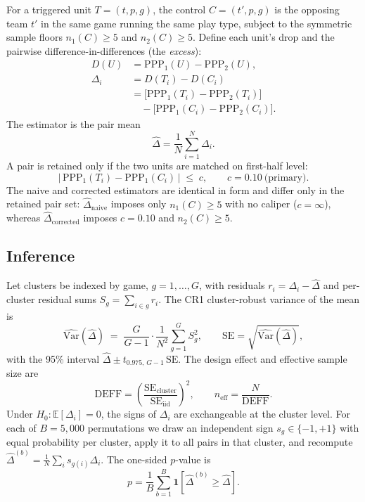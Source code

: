\documentclass[11pt]{article}
\begin{document}
For a triggered unit $T=(t,p,g)$, the control $C=(t',p,g)$ is the opposing team
$t'$ in the same game running the same play type, subject to the symmetric
sample floors $n_1(C)\geq5$ and $n_2(C)\geq5$. Define each unit's drop and the
pairwise difference-in-differences (the \emph{excess}):
%
\begin{equation}
\begin{split}
D(U) &= \mathrm{PPP}_1(U) - \mathrm{PPP}_2(U), \\
\Delta_i &= D(T_i) - D(C_i) \\
&= \bigl[\mathrm{PPP}_1(T_i) - \mathrm{PPP}_2(T_i)\bigr] \\
&\quad - \bigl[\mathrm{PPP}_1(C_i) - \mathrm{PPP}_2(C_i)\bigr].
\end{split}
\end{equation}
%
The estimator is the pair mean
%
\begin{equation}
\hat{\Delta} = \frac{1}{N} \sum_{i=1}^{N} \Delta_i .
\end{equation}
%
A pair is retained only if the two units are matched on first-half level:
%
\begin{equation}
\bigl|\, \mathrm{PPP}_1(T_i) - \mathrm{PPP}_1(C_i) \,\bigr| \;\leq\; c,
\qquad c = 0.10 \ \text{(primary)} .
\end{equation}
%
The naive and corrected estimators are identical in form and differ only in the
retained pair set: $\hat{\Delta}_{\mathrm{naive}}$ imposes only $n_1(C)\geq5$
with no caliper ($c=\infty$), whereas $\hat{\Delta}_{\mathrm{corrected}}$
imposes $c=0.10$ and $n_2(C)\geq5$.

\subsection{Inference}

Let clusters be indexed by game, $g = 1, \dots, G$, with residuals
$r_i = \Delta_i - \hat{\Delta}$ and per-cluster residual sums
$S_g = \sum_{i \in g} r_i$. The CR1 cluster-robust variance of the mean is
%
\begin{equation}
\widehat{\mathrm{Var}}(\hat{\Delta})
  \;=\; \frac{G}{G-1} \cdot \frac{1}{N^{2}} \sum_{g=1}^{G} S_g^{2},
\qquad
\mathrm{SE} = \sqrt{\widehat{\mathrm{Var}}(\hat{\Delta})},
\end{equation}
%
with the 95\% interval $\hat{\Delta} \pm t_{0.975,\,G-1}\,\mathrm{SE}$. The design
effect and effective sample size are
%
\begin{equation}
\mathrm{DEFF} = \left(
  \frac{\mathrm{SE}_{\mathrm{cluster}}}{\mathrm{SE}_{\mathrm{iid}}}
\right)^{2},
\qquad
n_{\mathrm{eff}} = \frac{N}{\mathrm{DEFF}} .
\end{equation}
%
Under $H_0 : \mathbb{E}[\Delta_i] = 0$, the signs of $\Delta_i$ are exchangeable
at the cluster level. For each of $B = 5{,}000$ permutations we draw an
independent sign $s_g \in \{-1, +1\}$ with equal probability per cluster, apply
it to all pairs in that cluster, and recompute
$\hat{\Delta}^{(b)} = \frac{1}{N} \sum_{i} s_{g(i)} \Delta_i$. The one-sided
$p$-value is
%
\begin{equation}
p = \frac{1}{B} \sum_{b=1}^{B}
  \mathbf{1}\!\left[ \hat{\Delta}^{(b)} \geq \hat{\Delta} \right].
\end{equation}
\end{document}
